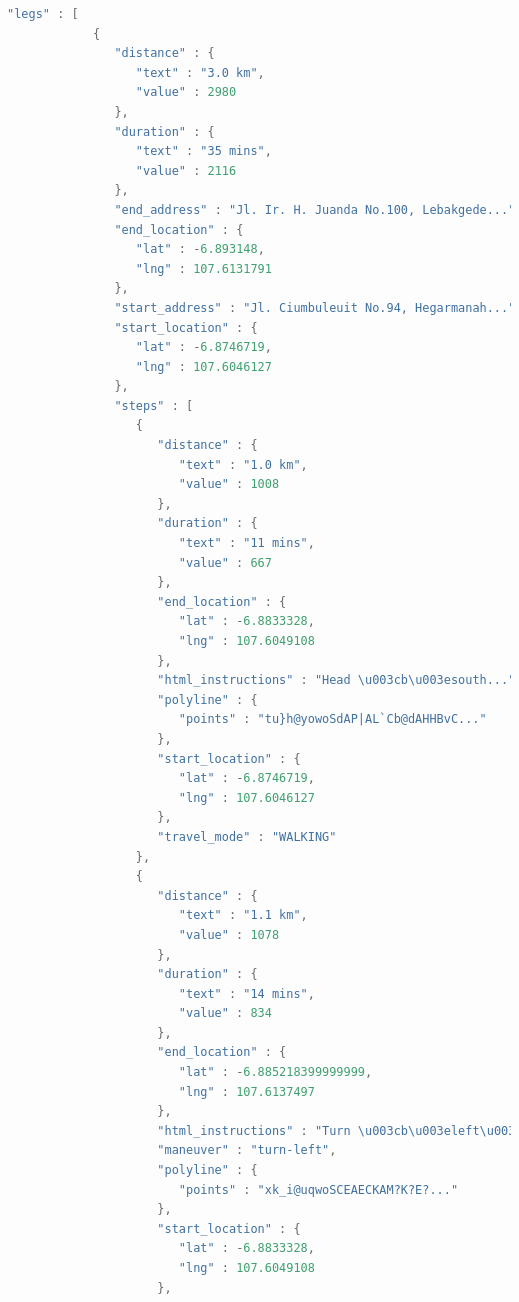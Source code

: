 \begin{lstlisting}[caption={Atribut \textit{legs} dari \textit{Directions API}},label={list:directions_legs},language=java]
         "legs" : [
            {
               "distance" : {
                  "text" : "3.0 km",
                  "value" : 2980
               },
               "duration" : {
                  "text" : "35 mins",
                  "value" : 2116
               },
               "end_address" : "Jl. Ir. H. Juanda No.100, Lebakgede...",
               "end_location" : {
                  "lat" : -6.893148,
                  "lng" : 107.6131791
               },
               "start_address" : "Jl. Ciumbuleuit No.94, Hegarmanah...",
               "start_location" : {
                  "lat" : -6.8746719,
                  "lng" : 107.6046127
               },
               "steps" : [
                  {
                     "distance" : {
                        "text" : "1.0 km",
                        "value" : 1008
                     },
                     "duration" : {
                        "text" : "11 mins",
                        "value" : 667
                     },
                     "end_location" : {
                        "lat" : -6.8833328,
                        "lng" : 107.6049108
                     },
                     "html_instructions" : "Head \u003cb\u003esouth...",
                     "polyline" : {
                        "points" : "tu}h@yowoSdAP|AL`Cb@dAHHBvC..."
                     },
                     "start_location" : {
                        "lat" : -6.8746719,
                        "lng" : 107.6046127
                     },
                     "travel_mode" : "WALKING"
                  },
                  {
                     "distance" : {
                        "text" : "1.1 km",
                        "value" : 1078
                     },
                     "duration" : {
                        "text" : "14 mins",
                        "value" : 834
                     },
                     "end_location" : {
                        "lat" : -6.885218399999999,
                        "lng" : 107.6137497
                     },
                     "html_instructions" : "Turn \u003cb\u003eleft\u003c/b...",
                     "maneuver" : "turn-left",
                     "polyline" : {
                        "points" : "xk_i@uqwoSCEAECKAM?K?E?..."
                     },
                     "start_location" : {
                        "lat" : -6.8833328,
                        "lng" : 107.6049108
                     },

\end{lstlisting}
